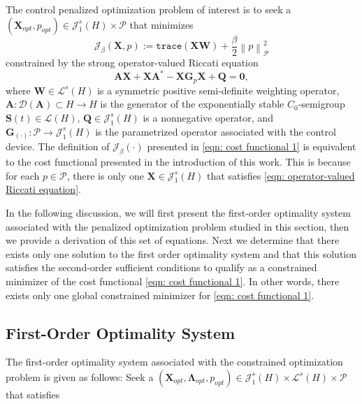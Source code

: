 \documentclass{amsart}
\newcommand{\sL}{\mathscr L}
\newcommand{\sJ}{\mathscr J}
\newcommand{\p}[1]{\left( {#1} \right)}
\newcommand{\norm}[1]{\left\| #1 \right\|}
\newcommand{\trace}[1]{\texttt{trace}\left( #1\right)}
\newcommand{\sP}{\mathcal{P}}
\newcommand{\bA}{\mathbf A}
\newcommand{\bX}{\mathbf X}
\newcommand{\bQ}{\mathbf Q}
\newcommand{\bG}{\mathbf G}
\newcommand{\bS}{\mathbf S}
\newcommand{\bLambda}{\boldsymbol{\Lambda}}
\newcommand{\bW}{\mathbf W}
\begin{document}
The control penalized optimization problem of interest is to seek a $\p{\bX_{opt},p_{opt}} \in \sJ_1^s(H) \times \sP$ that minimizes
\begin{equation} 
\label{eqn: cost functional 1}
    \mathcal J_\beta(\bX,p) := \trace{\bX \bW} + \frac{\beta}{2}\norm{p}_{\sP}^2
\end{equation}
constrained by the strong operator-valued Riccati equation
\begin{equation}
\label{eqn: operator-valued Riccati equation}
    \bA\bX + \bX\bA^* - \bX\bG_p\bX + \bQ = \mathbf 0,
\end{equation}
where $\bW \in \sL^s(H)$ is a symmetric positive semi-definite weighting operator, $\bA: \mathcal D(\bA) \subset H \rightarrow H$ is the generator of the exponentially stable $C_0$-semigroup $\bS(t) \in \sL(H)$, $\bQ \in \sJ_1^s(H)$ is a nonnegative operator, and $\bG_{\p{\cdot}}: \sP \rightarrow \sJ_1^s(H)$ is the parametrized operator associated with the control device. The definition of $\mathcal J_{\beta}(\cdot)$ presented in \eqref{eqn: cost functional 1} is equivalent to the cost functional presented in the introduction of this work. This is because for each $p \in \sP$, there is only one $\bX\in \sJ_1^s(H)$ that satisfies \eqref{eqn: operator-valued Riccati equation}.

In the following discussion, we will first present the first-order optimality system associated with the penalized optimization problem studied in this section, then we provide a derivation of this set of equations. Next we determine that there exists only one solution to the first order optimality system and that this solution satisfies the second-order sufficient conditions to qualify as a constrained minimizer of the cost functional \eqref{eqn: cost functional 1}. In other words, there exists only one global constrained minimizer for \eqref{eqn: cost functional 1}. 

\subsection{First-Order Optimality System}
The first-order optimality system associated with the constrained optimization problem is given as follows: Seek a $\p{\bX_{opt},\bLambda_{opt}, p_{opt}} \in \sJ_1^{s}(H) \times \sL^{s}(H) \times \sP$ that satisfies 
\end{document}

